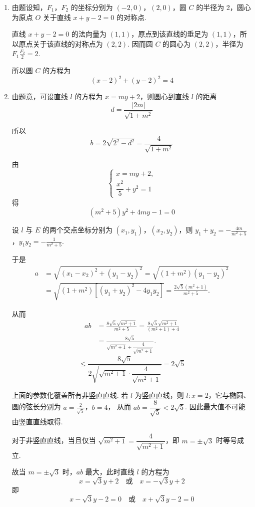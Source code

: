 \begin{solution}
\begin{enumerate}
\item 由题设知，\(F_{1}\)，\(F_{2}\) 的坐标分别为 \((-2,0)\)，\((2,0)\)，圆 \(C\) 的半径为 2，圆心为原点 \(O\) 关于直线 \(x+y-2=0\) 的对称点.

直线 \(x+y-2=0\) 的法向量为 \((1,1)\)，原点到该直线的垂足为 \((1,1)\)，所以原点关于该直线的对称点为 \((2,2)\). 因而圆 \(C\) 的圆心为 \((2,2)\)，半径为 \(F_{1}\frac{F_{2}}{2}=2\).

所以圆 \(C\) 的方程为
\[
(x-2)^{2}+(y-2)^{2}=4
\]

\item 由题意，可设直线 \(l\) 的方程为 \(x=my+2\)，则圆心到直线 \(l\) 的距离
\[
d=\frac{|2m|}{\sqrt{1+m^{2}}}
\]

所以
\[
b=2\sqrt{2^{2}-d^{2}}=\frac{4}{\sqrt{1+m^{2}}}
\]

由
\[
\begin{cases}
x=my+2,\\
\dfrac{x^{2}}{5}+y^{2}=1
\end{cases}
\]
得
\[
(m^{2}+5)y^{2}+4my-1=0
\]

设 \(l\) 与 \(E\) 的两个交点坐标分别为 \((x_{1},y_{1})\)，\((x_{2},y_{2})\)，则
\(y_{1}+y_{2}=-\frac{4m}{m^{2}+5}\)，\(y_{1}y_{2}=-\frac{1}{m^{2}+5}\).

于是
\[
\begin{aligned}
a&=\sqrt{(x_{1}-x_{2})^{2}+(y_{1}-y_{2})^{2}}=\sqrt{(1+m^{2})(y_{1}-y_{2})^{2}}\\
&=\sqrt{(1+m^{2})\left[(y_{1}+y_{2})^{2}-4y_{1}y_{2}\right]}=\frac{2\sqrt{5}(m^{2}+1)}{m^{2}+5}.
\end{aligned}
\]

从而
\[
\begin{aligned}
ab&=\frac{8\sqrt{5}\sqrt{m^{2}+1}}{m^{2}+5}=\frac{8\sqrt{5}\sqrt{m^{2}+1}}{(m^{2}+1)+4}\\
&=\frac{8\sqrt{5}}{\sqrt{m^{2}+1}+\dfrac{4}{\sqrt{m^{2}+1}}}.
\end{aligned}
\]
\[
\leqslant\frac{8\sqrt{5}}{2\sqrt{\sqrt{m^{2}+1}\cdot\dfrac{4}{\sqrt{m^{2}+1}}}}=2\sqrt{5}
\]

上面的参数化覆盖所有非竖直直线. 若 \(l\) 为竖直直线，则 \(l:x=2\)，它与椭圆、圆的弦长分别为
\(a=\frac{2}{\sqrt5}\)，\(b=4\)，
从而 \(ab=\dfrac{8}{\sqrt5}<2\sqrt5\). 因此最大值不可能由竖直直线取得.

对于非竖直直线，当且仅当 \(\sqrt{m^{2}+1}=\dfrac{4}{\sqrt{m^{2}+1}}\)，即 \(m=\pm\sqrt{3}\) 时等号成立.

故当 \(m=\pm\sqrt{3}\) 时，\(ab\) 最大，此时直线 \(l\) 的方程为
\[
x=\sqrt{3}y+2\quad\text{或}\quad x=-\sqrt{3}y+2
\]
即
\[
x-\sqrt{3}y-2=0\quad\text{或}\quad x+\sqrt{3}y-2=0
\]
\end{enumerate}
\end{solution}

